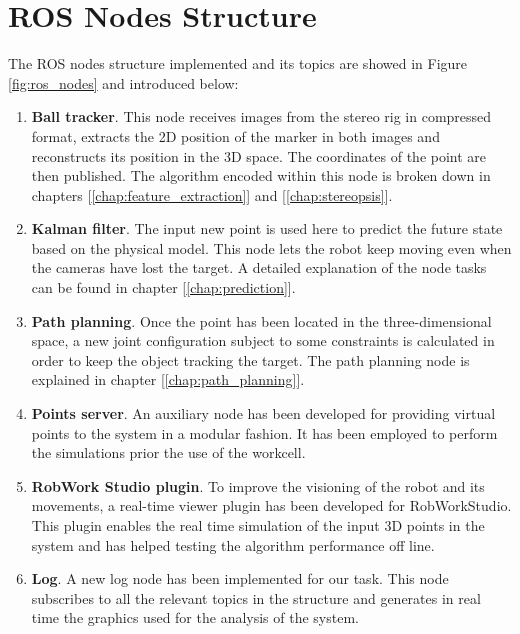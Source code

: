 \chapter{ROS Nodes Structure} %
\label{chap:ros_nodes_structure}
The ROS nodes structure implemented and its topics are showed in Figure \ref{fig:ros_nodes} and introduced below:
\begin{enumerate}
	\item \textbf{Ball tracker}. This node receives images from the stereo rig in compressed format, extracts the 2D position of the marker in both images and reconstructs its position in the 3D space. 
	The coordinates of the point are then published. The algorithm encoded within this node is broken down in chapters [\ref{chap:feature_extraction}] and [\ref{chap:stereopsis}].
	\item \textbf{Kalman filter}. The input new point is used here to predict the future state based on the physical model. This node lets the robot keep moving even when the cameras have lost the target. 
	A detailed explanation of the node tasks can be found in chapter [\ref{chap:prediction}].
	\item \textbf{Path planning}. Once the point has been located in the three-dimensional space, a new joint configuration subject to some constraints is calculated in order to keep the object tracking the target. 
	The path planning node is explained in chapter [\ref{chap:path_planning}].
	\item \textbf{Points server}. An auxiliary node has been developed for providing virtual points to the system in a modular fashion. 
	It has been employed to perform the simulations prior the use of the workcell.
	\item \textbf{RobWork Studio plugin}. To improve the visioning of the robot and its movements, a real-time viewer plugin has been developed for RobWorkStudio. 
	This plugin enables the real time simulation of the input 3D points in the system and has helped testing the algorithm performance off line.
	\item \textbf{Log}. A new log node has been implemented for our task. 
	This node subscribes to all the relevant topics in the structure and generates in real time the graphics used for the analysis of the system.
\end{enumerate}

